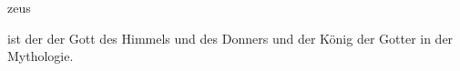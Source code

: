 \documentclass{stex}
\begin{document}
\begin{smodule}[sig=en]{zeus}
\begin{sparagraph}[style=symdoc]
 ist der der Gott des Himmels und des Donners und der König der
Gotter in der  Mythologie.
\end{sparagraph}
\end{smodule}
\end{document}
